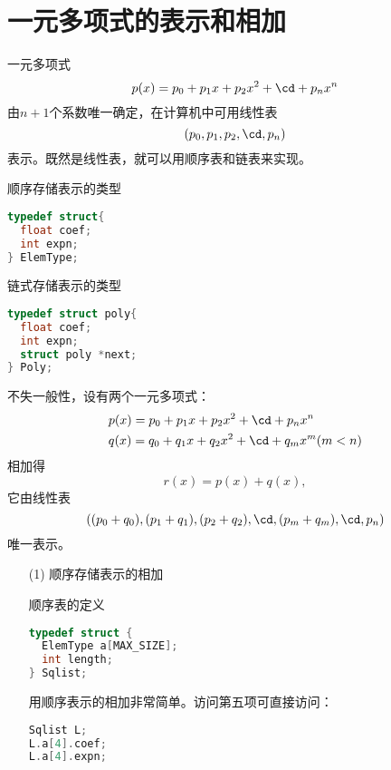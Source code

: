 \section{一元多项式的表示和相加}

\begin{frame}
一元多项式
$$
p(x)=p_0+p_1x+p_2x^2+\cd+p_nx^n
$$
由$n+1$个系数唯一确定，在计算机中可用线性表
$$
(p_0,p_1,p_2,\cd,p_n)
$$
表示。既然是线性表，就可以用顺序表和链表来实现。
\end{frame}

\begin{frame}[fragile]
\begin{block}{顺序存储表示的类型}
\begin{lstlisting}[language=C,frame=none]
typedef struct{
  float coef;
  int expn;
} ElemType;
\end{lstlisting}
\end{block}

\begin{block}{链式存储表示的类型}
\begin{lstlisting}[language=C,frame=none]
typedef struct poly{
  float coef;
  int expn;
  struct poly *next;
} Poly;
\end{lstlisting}
\end{block}
\end{frame}

\begin{frame}[fragile]
不失一般性，设有两个一元多项式：
$$
\begin{aligned}
&p(x)=p_0+p_1x+p_2x^2+\cd+p_nx^n\\
&q(x)=q_0+q_1x+q_2x^2+\cd+q_mx^m(m<n)
\end{aligned}
$$
相加得
$$
r(x)=p(x)+q(x),
$$
它由线性表
$$
((p_0+q_0),(p_1+q_1),(p_2+q_2),\cd,(p_m+q_m),\cd,p_n)
$$
唯一表示。
\end{frame}

\begin{frame}[fragile]
\begin{itemize}
\item[(1)] 顺序存储表示的相加
\begin{block}{顺序表的定义}
\begin{lstlisting}[language=C,frame=none]
typedef struct {
  ElemType a[MAX_SIZE];
  int length;
} Sqlist;
\end{lstlisting}
\end{block}
用顺序表示的相加非常简单。访问第五项可直接访问：
\begin{lstlisting}[language=C,frame=none]
Sqlist L;
L.a[4].coef;
L.a[4].expn;
\end{lstlisting}
\end{itemize}
\end{frame}

